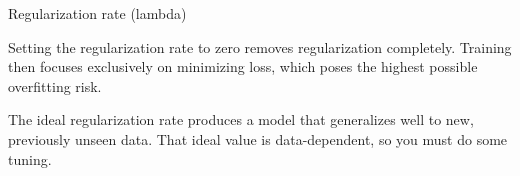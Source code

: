 \begin{frame}{Regularization rate (lambda)}
  \begin{withmargin}
    \begin{tdmargin}
      Setting the regularization rate to zero removes regularization completely.
      Training then focuses exclusively on minimizing loss, which poses the
      highest possible overfitting risk.
      \par\medskip
      The ideal regularization rate produces a model that generalizes well to
      new, previously unseen data. That ideal value is data-dependent, so you
      must do some tuning.
    \end{tdmargin}
  \end{withmargin}
\end{frame}

